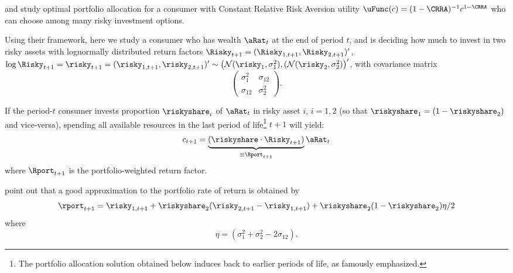 
\cite{merton:restat} and \cite{samuelson:portfolio} study
  optimal portfolio allocation for a consumer with Constant Relative Risk
  Aversion utility $\uFunc(c) = (1-\CRRA)^{-1}c^{1-\CRRA}$ who can choose
among many risky investment options.

Using their framework, here we study a consumer who has wealth
$\aRat_{t}$ at the end of period $t$, and is deciding how much to
invest in two risky assets with lognormally distributed return factors
$\Risky_{t+1}=(\Risky_{1,t+1}, \Risky_{2,t+1})'$, $\log \Risky_{t+1} =
\risky_{t+1}=(\risky_{1,t+1}, \risky_{2,t+1})' \sim \left (
  \mathcal{N}(\risky_1,\sigma^{2}_{1}), (
  \mathcal{N}(\risky_2,\sigma^{2}_{2}) \right)'$, with covariance
matrix
\begin{equation*}
 \left(\begin{array}{ccc}\sigma_1^2 & \sigma_{12} \\ \sigma_{12}& \sigma_2^2\end{array}\right).
\end{equation*}


If the period-$t$ consumer invests proportion $\riskyshare_i$ of $\aRat_{t}$ in  risky asset $i$, $i=1,2$ (so that $\riskyshare_{1}=(1-\riskyshare_{2})$ and vice-versa), spending all available resources in the last period of life\footnote{The portfolio allocation solution obtained below induces back to earlier periods of life, as \cite{samuelsonFallacy,samuelsonJudgment} famously emphasized.} $t+1$ will yield:
\begin{equation}\begin{gathered}\begin{aligned}
c_{t+1}  =  \underbrace{(\riskyshare \cdot \Risky_{t+1} )}_{\equiv \Rport_{t+1}} \aRat_{t} \notag \label{eq:RportDef}
\end{aligned}\end{gathered}\end{equation}
where $\Rport_{t+1}$ is the portfolio-weighted return factor.

\cite{cvAppendix} point out that a good approximation to the portfolio rate of return is obtained by
\begin{equation}\begin{gathered}\begin{aligned}
\rport_{t+1} = \risky_{1,t+1}+\riskyshare_{2} (\risky_{2,t+1}-\risky_{1,t+1})+ \riskyshare_2 (1-\riskyshare_2) \eta/2
\end{aligned}\end{gathered}\end{equation}
where
$$\eta=(\sigma_1^2+\sigma_2^2-2\sigma_{12}). $$

